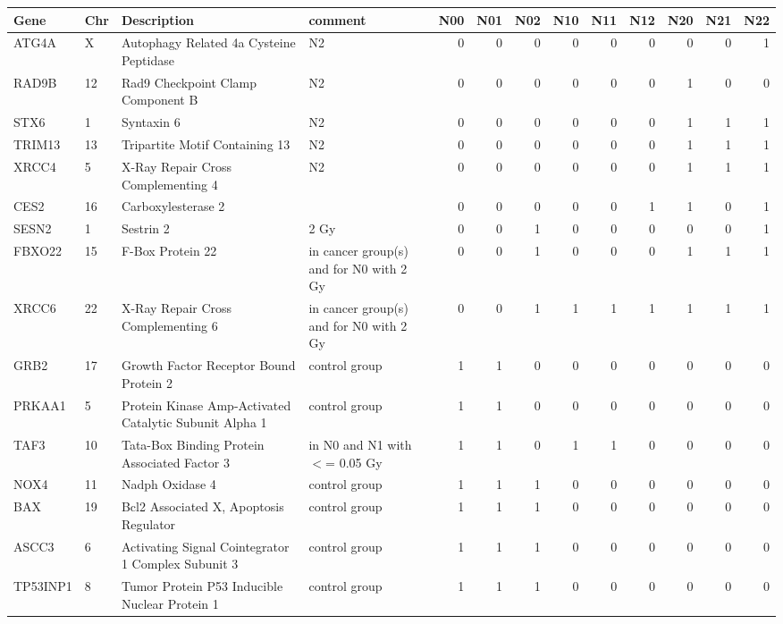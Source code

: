 \begin{table}[ht]
\centering
\begin{tabular}{llllrrrrrrrrr}
  \toprule
Gene & Chr & Description & comment & N00 & N01 & N02 & N10 & N11 & N12 & N20 & N21 & N22 \\ 
  \midrule
ATG4A & X & Autophagy Related 4a Cysteine Peptidase & N2 & 0 & 0 & 0 & 0 & 0 & 0 & 0 & 0 & 1 \\ 
  RAD9B & 12 & Rad9 Checkpoint Clamp Component B & N2 & 0 & 0 & 0 & 0 & 0 & 0 & 1 & 0 & 0 \\ 
  STX6 & 1 & Syntaxin 6 & N2 & 0 & 0 & 0 & 0 & 0 & 0 & 1 & 1 & 1 \\ 
  TRIM13 & 13 & Tripartite Motif Containing 13 & N2 & 0 & 0 & 0 & 0 & 0 & 0 & 1 & 1 & 1 \\ 
  XRCC4 & 5 & X-Ray Repair Cross Complementing 4 & N2 & 0 & 0 & 0 & 0 & 0 & 0 & 1 & 1 & 1 \\ 
  CES2 & 16 & Carboxylesterase 2 &  & 0 & 0 & 0 & 0 & 0 & 1 & 1 & 0 & 1 \\ 
  SESN2 & 1 & Sestrin 2 & 2 Gy & 0 & 0 & 1 & 0 & 0 & 0 & 0 & 0 & 1 \\ 
  FBXO22 & 15 & F-Box Protein 22 & in cancer group(s) and for N0 with 2 Gy & 0 & 0 & 1 & 0 & 0 & 0 & 1 & 1 & 1 \\ 
  XRCC6 & 22 & X-Ray Repair Cross Complementing 6 & in cancer group(s) and for N0 with 2 Gy & 0 & 0 & 1 & 1 & 1 & 1 & 1 & 1 & 1 \\ 
  GRB2 & 17 & Growth Factor Receptor Bound Protein 2 & control group & 1 & 1 & 0 & 0 & 0 & 0 & 0 & 0 & 0 \\ 
  PRKAA1 & 5 & Protein Kinase Amp-Activated Catalytic Subunit Alpha 1 & control group & 1 & 1 & 0 & 0 & 0 & 0 & 0 & 0 & 0 \\ 
  TAF3 & 10 & Tata-Box Binding Protein Associated Factor 3 & in N0 and N1 with $<$= 0.05 Gy & 1 & 1 & 0 & 1 & 1 & 0 & 0 & 0 & 0 \\ 
  NOX4 & 11 & Nadph Oxidase 4 & control group & 1 & 1 & 1 & 0 & 0 & 0 & 0 & 0 & 0 \\ 
  BAX & 19 & Bcl2 Associated X, Apoptosis Regulator & control group & 1 & 1 & 1 & 0 & 0 & 0 & 0 & 0 & 0 \\ 
  ASCC3 & 6 & Activating Signal Cointegrator 1 Complex Subunit 3 & control group & 1 & 1 & 1 & 0 & 0 & 0 & 0 & 0 & 0 \\ 
  TP53INP1 & 8 & Tumor Protein P53 Inducible Nuclear Protein 1 & control group & 1 & 1 & 1 & 0 & 0 & 0 & 0 & 0 & 0 \\ 

\end{tabular}
\end{table}
